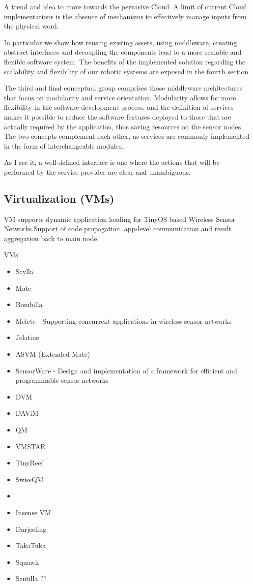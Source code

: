 A trend and idea to move towards the pervasive Cloud.
A limit of current Cloud implementations is the absence of mechanisms to effectively manage inputs from the physical word.



In particular we show how reusing existing assets, using middleware, creating abstract interfaces and decoupling the components lead to a more scalable and flexible software system. The benefits of the implemented solution regarding the scalability and flexibility
of our robotic systems are exposed in the fourth section

The third and final conceptual group comprises those middleware architectures that focus on modularity and service orientation.
Modularity allows for more flexibility in the software development process, and the definition of services makes it possible to reduce the software features deployed to those that are actually required by the application, thus saving resources on the sensor nodes. The two concepts complement each other, as services are commonly implemented in the form of interchangeable modules. 




As I see it, a well-defined interface is one where the actions that will be performed by the service provider are clear and unambiguous.


\subsection{Virtualization (VMs)} 

VM supports dynamic application loading for TinyOS based Wireless Sensor Networks.Support of code propagation, app-level communication and result aggregation back to main node. 

VMs

\begin{itemize}
	\item Scylla
	\item Mate
	\item Bombilla
	\item Melete - Supporting concurrent applications in wireless sensor networks
	\item Jelatine
	\item ASVM (Extended Mate)
	\item SensorWare - Design and implementation of a framework for efficient and programmable sensor networks
	\item DVM
	\item DAViM
	\item QM
	\item VMSTAR
	\item TinyReef
	\item SwissQM
	\item
	\item Insense VM
	\item Darjeeling
	\item TakaTuka
	\item Squawk
	\item Sentilla ??
\end{itemize}

